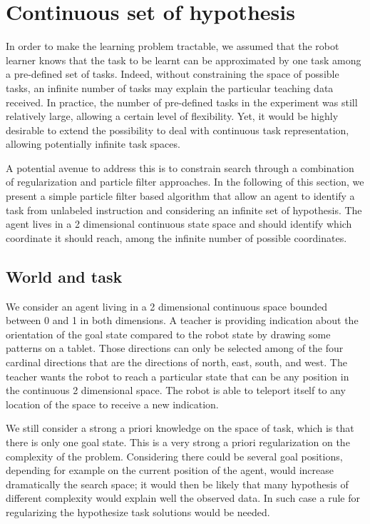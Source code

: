 
\section{Continuous set of hypothesis}
\label{chapter:limitations:continuoushypothesis}


In order to make the learning problem tractable, we assumed that the robot learner knows that the task to be learnt can be approximated by one task among a pre-defined set of tasks. Indeed, without constraining the space of possible tasks, an infinite number of tasks may explain the particular teaching data received. In practice, the number of pre-defined tasks in the experiment was still relatively large, allowing a certain level of flexibility. Yet, it would be highly desirable to extend the possibility to deal with continuous task representation, allowing potentially infinite task spaces. 

A potential avenue to address this is to constrain search through a combination of regularization and particle filter approaches. In the following of this section, we present a simple particle filter based algorithm that allow an agent to identify a task from unlabeled instruction and considering an infinite set of hypothesis. The agent lives in a 2 dimensional continuous state space and should identify which  coordinate it should reach, among the infinite number of possible coordinates.

\subsection{World and task}

We consider an agent living in a 2 dimensional continuous space bounded between 0 and 1 in both dimensions. A teacher is providing indication about the orientation of the goal state compared to the robot state by drawing some patterns on a tablet. Those directions can only be selected among of the four cardinal directions that are the directions of north, east, south, and west. The teacher wants the robot to reach a particular state that can be any position in the continuous 2 dimensional space. The robot is able to teleport itself to any location of the space to receive a new indication.

We still consider a strong a priori knowledge on the space of task, which is that there is only one goal state. This is a very strong a priori regularization on the complexity of the problem. Considering there could be several goal positions, depending for example on the current position of the agent, would increase dramatically the search space; it would then be likely that many hypothesis of different complexity would explain well the observed data. In such case a rule for regularizing the hypothesize task solutions would be needed.

